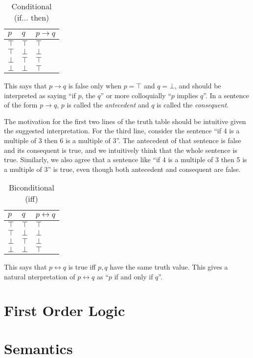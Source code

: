\documentclass[12pt]{article}
\begin{document}
\begin{table}[h!]
\centering
\caption{Conditional (if... then)}
\label{my-label}
\begin{tabular}{l|l|l}
$p$    & $q$    & $p \rightarrow q$ \\ \hline
$\top$ & $\top$ & $\top$      \\
$\top$ & $\bot$ & $\bot$    \\
$\bot$ & $\top$ & $\top$    \\
$\bot$ & $\bot$ & $\top$    
\end{tabular}
\end{table}
This says that $p \rightarrow q$ is false only when $p = \top$ and $q = \bot$, and should be interpreted as saying ``if $p$, the $q$'' or more colloquially ``$p$ implies $q$''. In a sentence of the form $p \rightarrow q$, $p$ is called the \emph{antecedent} and $q$ is called the \emph{consequent}. 

The motivation for the first two lines of the truth table should be intuitive given the suggested interpretation. For the third line, consider the sentence ``if 4 is a multiple of 3 then 6 is a multiple of 3''. The antecedent of that sentence is false and its consequent is true, and we intuitively think that the whole sentence is true. Similarly, we also agree that a sentence like ``if 4 is a multiple of 3 then 5 is a multiple of 3'' is true, even though both antecedent and consequent are false. 

\begin{table}[h!]
\centering
\caption{Biconditional (iff)}
\label{my-label}
\begin{tabular}{l|l|l}
$p$    & $q$    & $p \leftrightarrow q$ \\ \hline
$\top$ & $\top$ & $\top$      \\
$\top$ & $\bot$ & $\bot$    \\
$\bot$ & $\top$ & $\bot$    \\
$\bot$ & $\bot$ & $\top$    
\end{tabular}
\end{table} 
This says that $p \leftrightarrow q$ is true iff $p, q$ have the same truth value. This gives a natural nterpretation of $p \leftrightarrow q$ as ``$p$ if and only if $q$''. 

\newpage
\part{First Order Logic}

\newpage
\part{Semantics}
\end{document}
